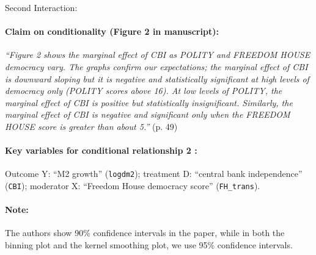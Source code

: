 \documentclass[12pt]{article}
\begin{document}
\clearpage


\noindent Second Interaction:

\paragraph{Claim on conditionality (Figure 2 in manuscript):}

\emph{``Figure 2 shows the marginal effect of CBI as POLITY and
  FREEDOM HOUSE democracy vary. The graphs confirm our expectations;
  the marginal effect of CBI is downward sloping but it is negative
  and statistically significant at high levels of democracy only
  (POLITY scores above 16). At low levels of POLITY, the marginal
  effect of CBI is positive but statistically
  insignificant. Similarly, the marginal effect of CBI is negative and
  significant only when the FREEDOM HOUSE score is greater than about  5.''} (p. 49)

\paragraph{Key variables for conditional relationship 2 :} Outcome Y:
``M2 growth'' (\texttt{logdm2}); treatment D: ``central bank
independence'' (\texttt{CBI}); moderator X: ``Freedom House democracy score'' (\texttt{FH\_trans}).


\paragraph{Note:} The authors show 90\% confidence intervals in the paper, while in both the binning plot and the kernel smoothing plot, we use 95\% confidence intervals.
\end{document}
